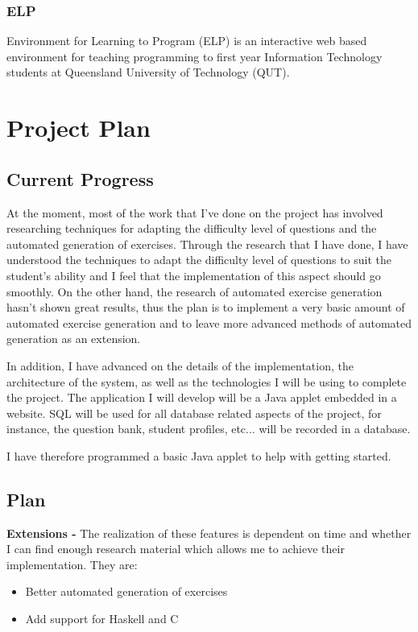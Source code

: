 \documentclass[11pt,a4paper]{report}
\begin{document}
\subsection{ELP}
Environment for Learning to Program (ELP) is an interactive web based environment for teaching programming to first year Information Technology students at Queensland University of Technology (QUT). 



\chapter{Project Plan}
\section{Current Progress}
At the moment, most of the work that I've done on the project has involved researching techniques for adapting the difficulty level of questions and the automated generation of exercises. Through the research that I have done, I have understood the techniques to adapt the difficulty level of questions to suit the student's ability and I feel that the implementation of this aspect should go smoothly. On the other hand, the research of automated exercise generation hasn't shown great results, thus the plan is to implement a very basic amount of automated exercise generation and to leave more advanced methods of automated generation as an extension.
\newline

In addition, I have advanced on the details of the implementation, the architecture of the system, as well as the technologies I will be using to complete the project. The application I will develop will be a Java applet embedded in a website. SQL will be used for all database related aspects of the project, for instance, the question bank, student profiles, etc... will be recorded in a database. \newline

I have therefore programmed a basic Java applet to help with getting started.

\section{Plan}

\textbf{Extensions -} The realization of these features is dependent on time and whether I can find enough research material which allows me to achieve their implementation. They are:
\begin{itemize}
\item Better automated generation of exercises
\item Add support for Haskell and C
\end{itemize}
\end{document}
